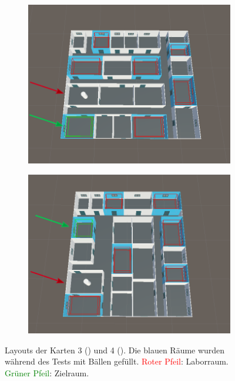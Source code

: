 \begin{figure}[h]
    \begin{subfigure}{0.49\linewidth}
        \centering
        \includegraphics[width=\linewidth]{figures/screenshots/map_3_x}
        \caption{}
        \label{sfig:map_3}
    \end{subfigure}%
    \hfill
    \begin{subfigure}{0.49\linewidth}
        \centering
        \includegraphics[width=\linewidth]{figures/screenshots/map_4_x}
        \caption{}
        \label{sfig:map_4}
    \end{subfigure}%
    \caption{Layouts der Karten 3 () und 4 (). %
    Die blauen Räume wurden während des Tests mit Bällen gefüllt. %
    \textcolor{red}{Roter Pfeil}: Laborraum. %
    \textcolor{green}{Grüner Pfeil}: Zielraum.}
    \label{fig:map_3_and_4}
\end{figure}

